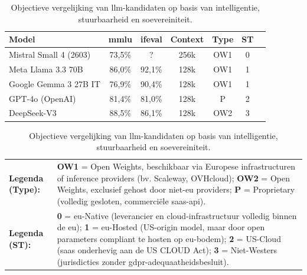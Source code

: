 \begin{table}[ht]
\centering
\small
\begin{tabular}{lcccccc}
\toprule
\textbf{Model} & \textbf{\gls{mmlu}} & \textbf{\gls{ifeval}} & \textbf{Context} & \textbf{Type} & \textbf{ST} \\
\midrule
Mistral Small 4 (2603)  & 73,5\% & ?      & 256k & OW1 & 0 \\ %
Meta Llama 3.3 70B      & 86,0\% & 92,1\% & 128k & OW1 & 1 \\ %
Google Gemma 3 27B IT   & 76,9\% & 90,4\% & 128k & OW1 & 1 \\ %
GPT-4o (OpenAI)         & 81,4\% & 81,0\% & 128k & P   & 2 \\
DeepSeek-V3             & 88,5\% & 86,1\% & 128k & OW2 & 3 \\
\bottomrule
\end{tabular}
\caption{Objectieve vergelijking van \gls{llm}-kandidaten op basis van intelligentie, stuurbaarheid en soevereiniteit.}
\label{tab:llm-longlist}
\vspace{2mm}
\centering
\footnotesize
\begin{tabular}{lp{12.5cm}}
\textbf{Legenda (Type):} & \textbf{OW1} = Open Weights, beschikbaar via Europese infrastructuren of inference providers (bv. Scaleway, OVHcloud); \textbf{OW2} = Open Weights, exclusief gehost door niet-\gls{eu} providers; \textbf{P} = Proprietary (volledig gesloten, commerciële \gls{saas}-\gls{api}). \\
\textbf{Legenda (ST):}   & \textbf{0} = \gls{eu}-Native (leverancier en cloud-infrastructuur volledig binnen de \gls{eu}); \textbf{1} = \gls{eu}-Hosted (US-origin model, maar door open parameters compliant te hosten op \gls{eu}-bodem); \textbf{2} = US-Cloud (\gls{saas} onderhevig aan de US CLOUD Act); \textbf{3} = Niet-Westers (jurisdicties zonder \gls{gdpr}-adequaatheidsbesluit).
\end{tabular}
\end{table}